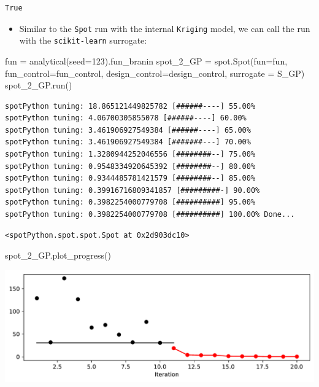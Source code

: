 \documentclass[
  letterpaper,
  DIV=11,
  numbers=noendperiod]{scrreprt}
\newenvironment{Shaded}{\begin{snugshade}}{\end{snugshade}}
\newcommand{\DecValTok}[1]{\textcolor[rgb]{0.68,0.00,0.00}{#1}}
\newcommand{\NormalTok}[1]{\textcolor[rgb]{0.00,0.23,0.31}{#1}}
\newcommand{\OperatorTok}[1]{\textcolor[rgb]{0.37,0.37,0.37}{#1}}
\providecommand{\tightlist}{%
  \setlength{\itemsep}{0pt}\setlength{\parskip}{0pt}}\usepackage{longtable,booktabs,array}
\begin{document}
\begin{verbatim}
True
\end{verbatim}

\begin{itemize}
\tightlist
\item
  Similar to the \texttt{Spot} run with the internal \texttt{Kriging}
  model, we can call the run with the \texttt{scikit-learn} surrogate:
\end{itemize}

\begin{Shaded}
\begin{Highlighting}[]
\NormalTok{fun }\OperatorTok{=}\NormalTok{ analytical(seed}\OperatorTok{=}\DecValTok{123}\NormalTok{).fun\_branin}
\NormalTok{spot\_2\_GP }\OperatorTok{=}\NormalTok{ spot.Spot(fun}\OperatorTok{=}\NormalTok{fun,}
\NormalTok{                     fun\_control}\OperatorTok{=}\NormalTok{fun\_control,}
\NormalTok{                     design\_control}\OperatorTok{=}\NormalTok{design\_control,}
\NormalTok{                     surrogate }\OperatorTok{=}\NormalTok{ S\_GP)}
\NormalTok{spot\_2\_GP.run()}
\end{Highlighting}
\end{Shaded}

\begin{verbatim}
spotPython tuning: 18.865121449825782 [######----] 55.00% 
spotPython tuning: 4.06700305855078 [######----] 60.00% 
spotPython tuning: 3.461906927549384 [######----] 65.00% 
spotPython tuning: 3.461906927549384 [#######---] 70.00% 
spotPython tuning: 1.3280944252046556 [########--] 75.00% 
spotPython tuning: 0.9548334920645392 [########--] 80.00% 
spotPython tuning: 0.9344485781421579 [########--] 85.00% 
spotPython tuning: 0.39916716809341857 [#########-] 90.00% 
spotPython tuning: 0.3982254000779708 [##########] 95.00% 
spotPython tuning: 0.3982254000779708 [##########] 100.00% Done...
\end{verbatim}

\begin{verbatim}
<spotPython.spot.spot.Spot at 0x2d903dc10>
\end{verbatim}

\begin{Shaded}
\begin{Highlighting}[]
\NormalTok{spot\_2\_GP.plot\_progress()}
\end{Highlighting}
\end{Shaded}

\includegraphics{010_num_spot_sklearn_surrogate_files/figure-pdf/cell-17-output-1.pdf}
\end{document}
